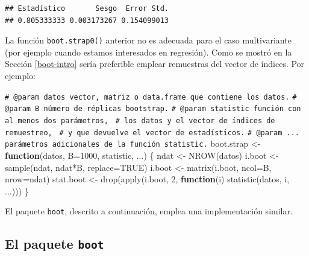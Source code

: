 \documentclass[
]{book}
\newenvironment{Shaded}{\begin{snugshade}}{\end{snugshade}}
\newcommand{\AttributeTok}[1]{\textcolor[rgb]{0.77,0.63,0.00}{#1}}
\newcommand{\CommentTok}[1]{\textcolor[rgb]{0.56,0.35,0.01}{\textit{#1}}}
\newcommand{\ConstantTok}[1]{\textcolor[rgb]{0.00,0.00,0.00}{#1}}
\newcommand{\ControlFlowTok}[1]{\textcolor[rgb]{0.13,0.29,0.53}{\textbf{#1}}}
\newcommand{\DecValTok}[1]{\textcolor[rgb]{0.00,0.00,0.81}{#1}}
\newcommand{\FunctionTok}[1]{\textcolor[rgb]{0.00,0.00,0.00}{#1}}
\newcommand{\NormalTok}[1]{#1}
\newcommand{\OtherTok}[1]{\textcolor[rgb]{0.56,0.35,0.01}{#1}}
\newcommand{\SpecialCharTok}[1]{\textcolor[rgb]{0.00,0.00,0.00}{#1}}
\theoremstyle{break}
\theoremstyle{nonumberplain}
\renewcommand{\CommentTok}[1]{\textcolor[rgb]{0.41,0.41,0.41}{\texttt{#1}}}
\begin{document}
\begin{verbatim}
## Estadístico       Sesgo  Error Std. 
## 0.805333333 0.003173267 0.154099013
\end{verbatim}

La función \texttt{boot.strap0()} anterior no es adecuada para el caso multivariante
(por ejemplo cuando estamos interesados en regresión).
Como se mostró en la Sección \ref{boot-intro}
sería preferible emplear remuestras del vector de índices. Por ejemplo:

\begin{Shaded}
\begin{Highlighting}[]
\CommentTok{\#\textquotesingle{} @param datos vector, matriz o data.frame que contiene los datos.}
\CommentTok{\#\textquotesingle{} @param B número de réplicas bootstrap.}
\CommentTok{\#\textquotesingle{} @param statistic función con al menos dos parámetros, }
\CommentTok{\#\textquotesingle{} los datos y el vector de índices de remuestreo, }
\CommentTok{\#\textquotesingle{} y que devuelve el vector de estadísticos.}
\CommentTok{\#\textquotesingle{} @param ... parámetros adicionales de la función statistic.}
\NormalTok{boot.strap }\OtherTok{\textless{}{-}} \ControlFlowTok{function}\NormalTok{(datos, }\AttributeTok{B=}\DecValTok{1000}\NormalTok{, statistic, ...) \{}
\NormalTok{  ndat }\OtherTok{\textless{}{-}} \FunctionTok{NROW}\NormalTok{(datos)}
\NormalTok{  i.boot }\OtherTok{\textless{}{-}} \FunctionTok{sample}\NormalTok{(ndat, ndat}\SpecialCharTok{*}\NormalTok{B, }\AttributeTok{replace=}\ConstantTok{TRUE}\NormalTok{)}
\NormalTok{  i.boot }\OtherTok{\textless{}{-}} \FunctionTok{matrix}\NormalTok{(i.boot, }\AttributeTok{ncol=}\NormalTok{B, }\AttributeTok{nrow=}\NormalTok{ndat)}
\NormalTok{  stat.boot }\OtherTok{\textless{}{-}} \FunctionTok{drop}\NormalTok{(}\FunctionTok{apply}\NormalTok{(i.boot, }\DecValTok{2}\NormalTok{, }\ControlFlowTok{function}\NormalTok{(i) }\FunctionTok{statistic}\NormalTok{(datos, i, ...)))}
\NormalTok{\}}
\end{Highlighting}
\end{Shaded}

El paquete \texttt{boot}, descrito a continuación, emplea una implementación similar.

\hypertarget{intro-pkgboot}{%
\subsection{\texorpdfstring{El paquete \texttt{boot}}{El paquete boot}}\label{intro-pkgboot}}
\end{document}
